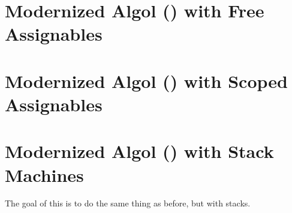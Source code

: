 \section{Modernized Algol (\LangMA{}) with Free Assignables}







\break

\section{Modernized Algol (\LangMA{}) with Scoped Assignables}







\break

\section{Modernized Algol (\LangMA{}) with Stack Machines}

The goal of this is to do the same thing as before, but with stacks.






